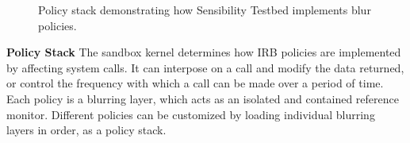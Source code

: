 \begin{figure}
\caption{\small Policy stack demonstrating how Sensibility Testbed implements blur policies. 
\label{fig-blur}}
\end{figure}

\textbf{Policy Stack}
The sandbox kernel determines how IRB policies are implemented by affecting system calls. It can
interpose on a call and modify the data returned, or control the frequency with which a call can be made over
a period of time. 
%
Each policy is a blurring layer, which acts as an isolated and 
contained reference monitor. Different policies can be customized 
by loading individual blurring layers in order, as a policy stack. 

